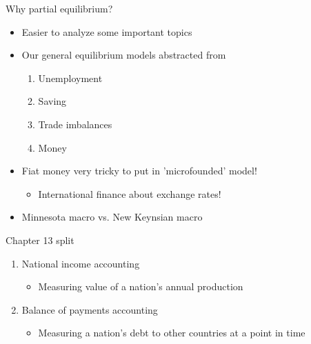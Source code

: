 \documentclass{beamer}
\begin{document}
\begin{frame}{Why partial equilibrium?}

    \begin{itemize}
        \item Easier to analyze some important topics
        \item Our general equilibrium models abstracted from
        \begin{enumerate}
            \item Unemployment
            \item Saving
            \item Trade imbalances
            \item Money
        \end{enumerate}
        \item Fiat money very tricky to put in 'microfounded' model!
        \begin{itemize}
            \item International finance about exchange rates!
        \end{itemize}
        \item Minnesota macro vs. New Keynsian macro
    \end{itemize}

\end{frame}

\begin{frame}{Chapter 13 split}

    \begin{enumerate}
        \item National income accounting
        \begin{itemize}
            \item Measuring value of a nation's annual production
        \end{itemize}
        \item Balance of payments accounting
        \begin{itemize}
            \item Measuring a nation's debt to other countries at a point in time
        \end{itemize}
    \end{enumerate}

\end{frame}

\end{document}

